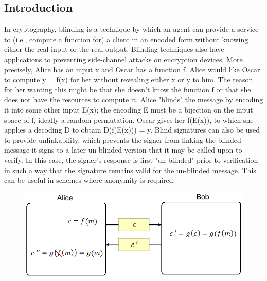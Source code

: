 \documentclass{article}
\begin{document}
\subsection{Introduction}
In cryptography, blinding is a technique by which an agent can provide a service to (i.e., compute a function for) a client in an encoded form without knowing either the real input or the real output. Blinding techniques also have applications to preventing side-channel attacks on encryption devices.
More precisely, Alice has an input x and Oscar has a function f. Alice would like Oscar to compute y = f(x) for her without revealing either x or y to him. The reason for her wanting this might be that she doesn't know the function f or that she does not have the resources to compute it. Alice "blinds" the message by encoding it into some other input E(x); the encoding E must be a bijection on the input space of f, ideally a random permutation. Oscar gives her f(E(x)), to which she applies a decoding D to obtain D(f(E(x))) = y.
Blind signatures can also be used to provide unlinkability, which prevents the signer from linking the blinded message it signs to a later un-blinded version that it may be called upon to verify. In this case, the signer's response is first "un-blinded" prior to verification in such a way that the signature remains valid for the un-blinded message. This can be useful in schemes where anonymity is required.
\begin{figure}[h!]
\centering
\includegraphics[scale=0.5]{BlindSignature.jpg}
\end{figure}
\end{document}
